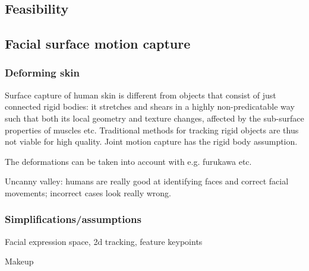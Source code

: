 




%
%
%



\subsection{Feasibility}

\subsection{Facial surface motion capture} %

\subsubsection{Deforming skin}


Surface capture of human skin is different from objects that consist of just connected rigid bodies: it stretches and shears in a highly non-predicatable way such that both its local geometry and texture changes, affected by the sub-surface properties of muscles etc.
Traditional methods for tracking rigid objects are thus not viable for high quality.
Joint motion capture has the rigid body assumption.

The deformations can be taken into account with e.g. furukawa etc.

Uncanny valley: humans are really good at identifying faces and correct facial movements; incorrect cases look really wrong.

\subsubsection{Simplifications/assumptions}

Facial expression space, 2d tracking, feature keypoints

Makeup

